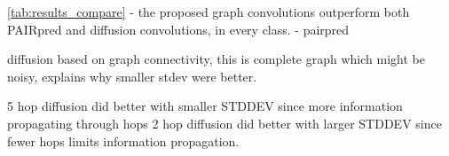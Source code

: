 \ref{tab:results_compare}
	- the proposed graph convolutions outperform both PAIRpred and diffusion convolutions, in every class.
	- pairpred 
	



diffusion based on graph connectivity, this is complete graph which might be noisy, explains why smaller stdev were better.

5 hop diffusion did better with smaller STDDEV since more information propagating through hops
2 hop diffusion did better with larger STDDEV since fewer hops limits information propagation.








